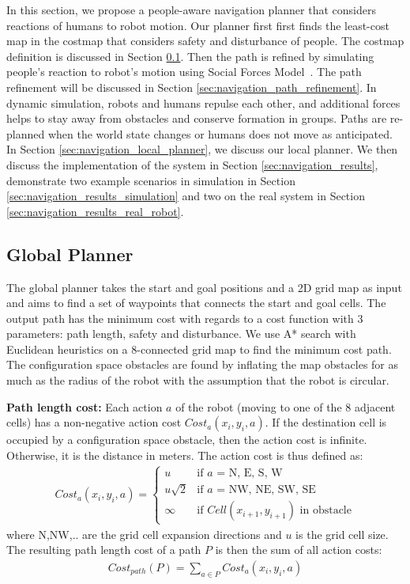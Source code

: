 In this section, we propose a people-aware navigation planner that considers reactions of humans to robot motion. Our planner first first finds the least-cost map in the costmap that considers safety and disturbance of people. The costmap definition is discussed in Section \ref{sec:navigation_global_planner}. Then the path is refined by simulating people's reaction to robot's motion using Social Forces Model~\cite{helbing1995social}. The path refinement will be discussed in Section \ref{sec:navigation_path_refinement}. In dynamic simulation, robots and humans repulse each other, and additional forces helps to stay away from obstacles and conserve formation in groups. Paths are re-planned when the world state changes or humans does not move as anticipated. In Section \ref{sec:navigation_local_planner}, we discuss our local planner. We then discuss the implementation of the system in Section \ref{sec:navigation_results}, demonstrate two example scenarios in simulation in Section \ref{sec:navigation_results_simulation} and two on the real system in Section \ref{sec:navigation_results_real_robot}.


\subsection{Global Planner}
\label{sec:navigation_global_planner}

The global planner takes the start and goal positions and a 2D grid map as input and aims to find a set of waypoints that connects the start and goal cells. The output path has the minimum cost with regards to a cost function with 3 parameters: path length, safety and disturbance. We use A* search with Euclidean heuristics on a 8-connected grid map to find the minimum cost path. The configuration space obstacles are found by inflating the map obstacles for as much as the radius of the robot with the assumption that the robot is circular.

\textbf{Path length cost:}  Each action $a$ of the robot (moving to one of the 8 adjacent cells) has a non-negative action cost $Cost_{a}(x_{i},y_{i},a)$. If the destination cell is occupied by a configuration space obstacle, then the action cost is infinite. Otherwise, it is the distance in meters. The action cost is thus defined as:
\begin{align}
Cost_{a}(x_{i},y_{i},a)=\left\{ \begin{array}{cl}
u & \textrm{if $a$ = N, E, S, W}\\
u\sqrt{2} & \textrm{if $a$ = NW, NE, SW, SE}\\
\infty & \textrm{if  $Cell(x_{i+1}, y_{i+1})$ in obstacle} \end{array}\right.
\end{align}
where N,NW,.. are the grid cell expansion directions and $u$ is the grid cell size. The resulting path length cost of a path $P$ is then the sum of all action costs: 
\begin{align}
Cost_{path}(P) = \sum\limits_{a \in P} Cost_{a}(x_{i},y_{i},a)
\end{align}

